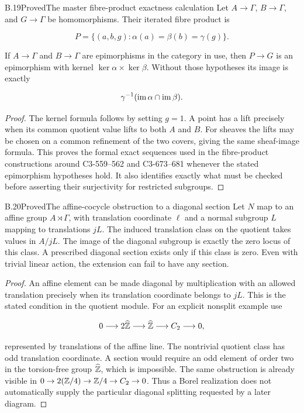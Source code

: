 \begin{statement}{B.19}{Proved}{The master fibre-product exactness calculation}
Let $A\to\Gamma$, $B\to\Gamma$, and $G\to\Gamma$ be
homomorphisms. Their iterated fibre product is

$$
P=\{(a,b,g):\alpha(a)=\beta(b)=\gamma(g)\}.
$$

If $A\to\Gamma$ and $B\to\Gamma$ are epimorphisms in
the category in use, then $P\to G$ is an epimorphism with
kernel $\ker\alpha\times\ker\beta$.
Without those hypotheses its image is exactly

$$
\gamma^{-1}(\operatorname{im}\alpha\cap\operatorname{im}\beta).
$$

\end{statement}
\begin{proof}
The kernel formula follows by setting $g=1$.
A point has a lift precisely when its common quotient value
lifts to both $A$ and $B$. For sheaves the lifts may be
chosen on a common refinement of the two covers, giving
the same sheaf-image formula.
This proves the formal exact sequences used in the
fibre-product constructions around C3-559--562 and
C3-673--681 whenever the stated epimorphism hypotheses hold.
It also identifies exactly what must be checked before
asserting their surjectivity for restricted subgroups.
\end{proof}

\begin{statement}{B.20}{Proved}{The affine-cocycle obstruction to a diagonal section}
Let $N$ map to an affine group $A\rtimes\Gamma$, with
translation coordinate $\ell$ and a normal subgroup $L$
mapping to translations $jL$. The induced translation
class on the quotient takes values in $A/jL$.
The image of the diagonal subgroup is exactly the zero
locus of this class. A prescribed diagonal section exists
only if this class is zero.
Even with trivial linear action, the extension can fail
to have any section.
\end{statement}
\begin{proof}
An affine element can be made diagonal by multiplication
with an allowed translation precisely when its translation
coordinate belongs to $jL$. This is the stated condition
in the quotient module.
For an explicit nonsplit example use

$$
0\longrightarrow2\widehat{\mathbb Z}\longrightarrow\widehat{\mathbb Z}
 \longrightarrow C_2\longrightarrow0,
$$

represented by translations of the affine line.
The nontrivial quotient class has odd translation coordinate.
A section would require an odd element of order two in
the torsion-free group $\widehat{\mathbb Z}$, which is impossible.
The same obstruction is already visible in
$0\to2(\mathbb Z/4)\to\mathbb Z/4\to C_2\to0$.
Thus a Borel realization does not automatically supply the
particular diagonal splitting requested by a later diagram.
\end{proof}

